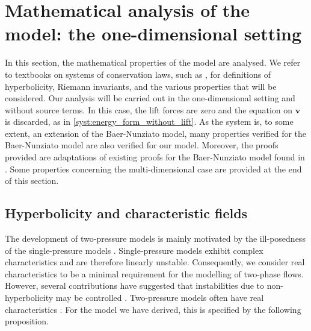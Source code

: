 \documentclass{myclass}
\begin{document}
\section{Mathematical analysis of the model: the one-dimensional setting}\label{sec:Model_analysis}

In this section, the mathematical properties of the model are analysed. We refer to textbooks on systems of conservation laws, such as \cite{godlewski:2021}, for definitions of hyperbolicity, Riemann invariants, and the various properties that will be considered. Our analysis will be carried out in the one-dimensional setting and without source terms. In this case, the lift forces are zero and the equation on $\bm{v}$ is discarded, as in \eqref{syst:energy_form_without_lift}. As the system is, to some extent, an extension of the Baer-Nunziato model, many properties verified for the Baer-Nunziato model are also verified for our model. Moreover, the proofs provided are adaptations of existing proofs for the Baer-Nunziato model found in \cite{gallouet:2004,coquel:2013}. Some properties concerning the multi-dimensional case are provided at the end of this section. 

\subsection{Hyperbolicity and characteristic fields}

The development of two-pressure models is mainly motivated by the ill-posedness of the single-pressure models \cite{lhuillier:2013}. Single-pressure models exhibit complex characteristics and are therefore linearly unstable. Consequently, we consider real characteristics to be a minimal requirement for the modelling of two-phase flows. However, several contributions have suggested that instabilities due to non-hyperbolicity may be controlled \cite{ramshaw:1978,vazquez-gonzalez:2016}.  Two-pressure models often have real characteristics \cite{ransom:1984, gallouet:2004}. For the model we have derived, this is specified by the following proposition. 
\end{document}
